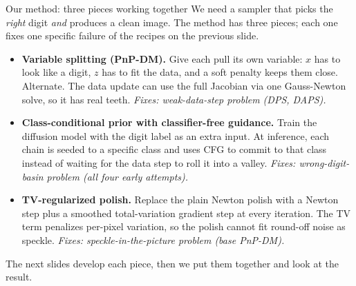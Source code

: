 \documentclass[aspectratio=169,10pt]{beamer}
\begin{document}
\begin{frame}{Our method: three pieces working together}
\footnotesize
We need a sampler that picks the \emph{right} digit \emph{and} produces
a clean image. The method has three pieces; each one fixes one specific
failure of the recipes on the previous slide.

\vspace{0.6em}
\begin{itemize}\itemsep=6pt
\item \textbf{Variable splitting (PnP-DM).} Give each pull its own
  variable: $x$ has to look like a digit, $z$ has to fit the data,
  and a soft penalty keeps them close. Alternate. The data update can
  use the full Jacobian via one Gauss-Newton solve, so it has real
  teeth. \textit{Fixes: weak-data-step problem (DPS, DAPS).}
\item \textbf{Class-conditional prior with classifier-free guidance.}
  Train the diffusion model with the digit label as an extra input.
  At inference, each chain is seeded to a specific class and uses CFG
  to commit to that class instead of waiting for the data step to roll
  it into a valley. \textit{Fixes: wrong-digit-basin problem (all four
  early attempts).}
\item \textbf{TV-regularized polish.} Replace the plain Newton polish
  with a Newton step plus a smoothed total-variation gradient step at
  every iteration. The TV term penalizes per-pixel variation, so the
  polish cannot fit round-off noise as speckle. \textit{Fixes:
  speckle-in-the-picture problem (base PnP-DM).}
\end{itemize}

\vspace{0.5em}
The next slides develop each piece, then we put them together and look
at the result.
\end{frame}
\end{document}
